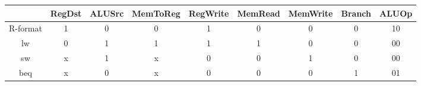 \begin{tabular}[t]{ccccccccc}
	\toprule
	         & RegDst & ALUSrc & MemToReg & RegWrite & MemRead & MemWrite & Branch & ALUOp \\
	\midrule
	R-format & 1      & 0      & 0        & 1        & 0       & 0        & 0      & 10    \\
	lw       & 0      & 1      & 1        & 1        & 1       & 0        & 0      & 00    \\
	sw       & x      & 1      & x        & 0        & 0       & 1        & 0      & 00    \\
	beq      & x      & 0      & x        & 0        & 0       & 0        & 1      & 01    \\
	\bottomrule
\end{tabular}
